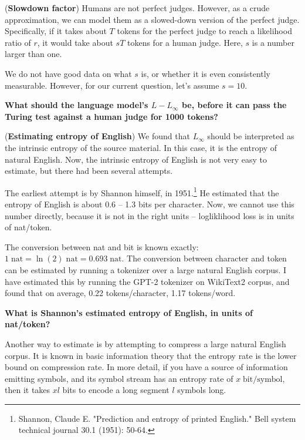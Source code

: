 \begin{enumerate}
    \qitem (\textbf{Slowdown factor}) Humans are not perfect judges. However, as a crude approximation, we can model them as a slowed-down version of the perfect judge. Specifically, if it takes about $T$ tokens for the perfect judge to reach a likelihood ratio of $r$, it would take about $sT$ tokens for a human judge. Here, $s$ is a number larger than one.

    We do not have good data on what $s$ is, or whether it is even consistently measurable. However, for our current question, let's assume $s=10$.

    \textbf{What should the language model's $L-L_\infty$ be, before it can pass the Turing test against a human judge for 1000 tokens?}



    \qitem (\textbf{Estimating entropy of English}) We found that $L_\infty$ should be interpreted as the intrinsic entropy of the source material. In this case, it is the entropy of natural English. Now, the intrinsic entropy of English is not very easy to estimate, but there had been several attempts.

    The earliest attempt is by Shannon himself, in 1951.\footnote{Shannon, Claude E. "Prediction and entropy of printed English." Bell system technical journal 30.1 (1951): 50-64.} He estimated that the entropy of English is about 0.6 -- 1.3 bits per character. Now, we cannot use this number directly, because it is not in the right units -- logliklihood loss is in units of nat/token.

    The conversion between nat and bit is known exactly: $1 \;\mathrm{nat} = \ln(2)\;\mathrm{nat}= 0.693\;\mathrm{nat}$. The conversion between character and token can be estimated by running a tokenizer over a large natural English corpus. I have estimated this by running the GPT-2 tokenizer on WikiText2 corpus, and found that on average, 0.22 tokens/character, 1.17 tokens/word.

    \textbf{What is Shannon's estimated entropy of English, in units of nat/token?}


    Another way to estimate is by attempting to compress a large natural English corpus. It is known in basic information theory that the entropy rate is the lower bound on compression rate. In more detail, if you have a source of information emitting symbols, and its symbol stream has an entropy rate of $x \;\mathrm{bit/symbol}$, then it takes $xl$ bits to encode a long segment $l$ symbols long.
    

\end{enumerate}
